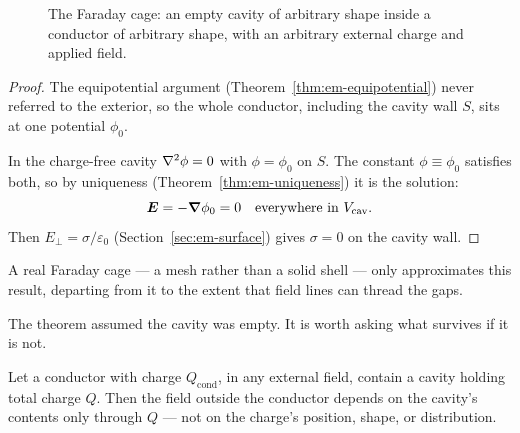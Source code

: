 \begin{figure}[H]
\begin{center}
\end{center}
\caption{The Faraday cage: an empty cavity of arbitrary shape inside a conductor of arbitrary shape, with an arbitrary external charge and applied field.}
\label{fig:em-faraday-cage}
\end{figure}

\begin{proof}
The equipotential argument (Theorem~\ref{thm:em-equipotential}) never referred to the exterior, so the whole conductor, including the cavity wall $S$, sits at one potential $\phi_0$.

In the charge-free cavity $\laplacian\phi = 0$ with $\phi=\phi_0$ on $S$. The constant $\phi\equiv\phi_0$ satisfies both, so by uniqueness (Theorem~\ref{thm:em-uniqueness}) it is the solution:
\[
    \vect{E} = -\grad\phi_0 = 0 \quad\text{everywhere in } V_\text{cav}.
\]
Then $E_\perp = \sigma/\varepsilon_0$ (Section~\ref{sec:em-surface}) gives $\sigma=0$ on the cavity wall.
\end{proof}

A real Faraday cage --- a mesh rather than a solid shell --- only approximates this result, departing from it to the extent that field lines can thread the gaps.

The theorem assumed the cavity was empty. It is worth asking what survives if it is not.

\begin{theorem}
\label{thm:em-cavity-charge}
Let a conductor with charge $Q_\text{cond}$, in any external field, contain a cavity holding total charge $Q$. Then the field outside the conductor depends on the cavity's contents only through $Q$ --- not on the charge's position, shape, or distribution.
\end{theorem}

